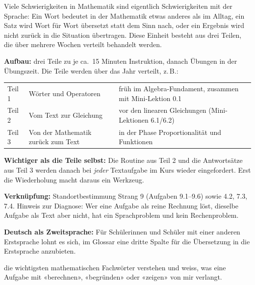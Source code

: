 \documentclass[11pt]{exam}
\begin{document}

Viele Schwierigkeiten in Mathematik sind eigentlich Schwierigkeiten mit der
Sprache: Ein Wort bedeutet in der Mathematik etwas anderes als im Alltag, ein
Satz wird Wort für Wort übersetzt statt dem Sinn nach, oder ein Ergebnis wird
nicht zurück in die Situation übertragen. Diese Einheit besteht aus drei
Teilen, die über mehrere Wochen verteilt behandelt werden.

\begin{lehrperson}[Überblick]
\textbf{Aufbau:} drei Teile zu je ca.\ 15 Minuten Instruktion, danach Übungen
in der Übungszeit. Die Teile werden über das Jahr verteilt, z.\,B.:

\begin{tabular}{@{}llp{7.2cm}@{}}
  Teil 1 & Wörter und Operatoren   & früh im Algebra-Fundament, zusammen mit Mini-Lektion 0.1 \\
  Teil 2 & Vom Text zur Gleichung  & vor den linearen Gleichungen (Mini-Lektionen 6.1/6.2) \\
  Teil 3 & Von der Mathematik zurück zum Text & in der Phase Proportionalität und Funktionen
\end{tabular}

\textbf{Wichtiger als die Teile selbst:} Die Routine aus Teil 2 und die
Antwortsätze aus Teil 3 werden danach bei \emph{jeder} Textaufgabe im Kurs
wieder eingefordert. Erst die Wiederholung macht daraus ein Werkzeug.

\textbf{Verknüpfung:} Standortbestimmung Strang 9 (Aufgaben 9.1--9.6) sowie
4.2, 7.3, 7.4. Hinweis zur Diagnose: Wer eine Aufgabe als reine Rechnung löst,
dieselbe Aufgabe als Text aber nicht, hat ein Sprachproblem und kein
Rechenproblem.

\textbf{Deutsch als Zweitsprache:} Für Schülerinnen und Schüler mit einer
anderen Erstsprache lohnt es sich, im Glossar eine dritte Spalte für die
Übersetzung in die Erstsprache anzubieten.
\end{lehrperson}

  {die wichtigsten mathematischen Fachwörter verstehen und weiss, was eine
   Aufgabe mit «berechnen», «begründen» oder «zeigen» von mir verlangt.}
\end{document}
